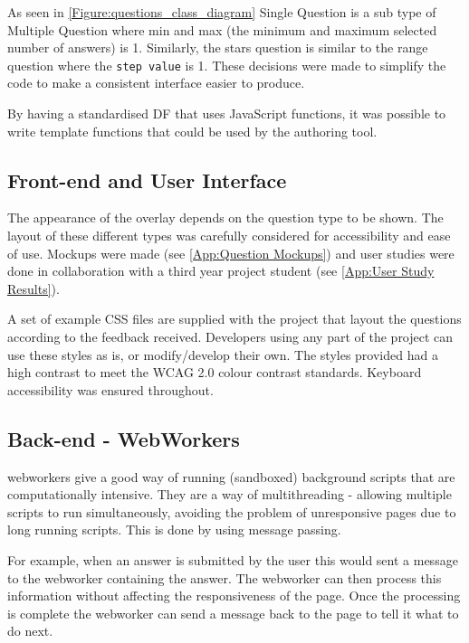 As seen in \autoref{Figure:questions_class_diagram} Single Question is a sub type of Multiple Question where min and max (the minimum and maximum selected number of answers) is 1. Similarly, the stars question is similar to the range question where the \lstinline|step value| is 1. These decisions were made to simplify the code to make a consistent interface easier to produce.

By having a standardised \gls{DF} that uses JavaScript functions, it was possible to write template functions that could be used by the authoring tool.

\subsection{Front-end and User Interface}

The appearance of the overlay depends on the question type to be shown. The layout of these different types was carefully considered for accessibility and ease of use. Mockups were made (see \cref{App:Question Mockups}) and user studies were done in collaboration with a third year project student (see \cref{App:User Study Results}).

A set of example \gls{CSS} files are supplied with the project that layout the questions according to the feedback received. Developers using any part of the project can use these styles as is, or modify/develop their own. The styles provided had a high contrast to meet the \gls{WCAG} 2.0 colour contrast standards. Keyboard accessibility was ensured throughout.

\subsection{Back-end - WebWorkers}
\label{Subsection:WebWorkers}

\Glspl{webworker} give a good way of running (sandboxed) background scripts that are computationally intensive. They are a way of multithreading - allowing multiple scripts to run simultaneously, avoiding the problem of unresponsive pages due to long running scripts. This is done by using message passing.

For example, when an answer is submitted by the user this would sent a message to the \gls{webworker} containing the answer. The \gls{webworker} can then process this information without affecting the responsiveness of the page. Once the processing is complete the \gls{webworker} can send a message back to the page to tell it what to do next.

